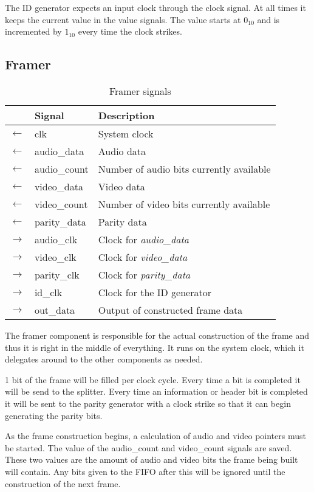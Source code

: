 The ID generator expects an input clock through the clock signal. At all times it keeps the current value in the value signals. The value starts at $0_{10}$ and is incremented by $1_{10}$ every time the clock strikes.

\subsection{Framer}
\begin{table}[!h]
\centering%
\caption{Framer signals}\label{tab:table}
\begin{tabular*}{\textwidth}{ll@{\hspace{1cm}}l}
  & \textbf{Signal} & \textbf{Description}\\\hline\hline
  $\leftarrow$ & clk & System clock\\\hline
  $\leftarrow$ & audio\_data & Audio data\\\hline
  $\leftarrow$ & audio\_count & Number of audio bits currently available\\\hline
  $\leftarrow$ & video\_data & Video data\\\hline
  $\leftarrow$ & video\_count & Number of video bits currently available\\\hline
  $\leftarrow$ & parity\_data & Parity data\\\hline
  $\rightarrow$ & audio\_clk & Clock for \textit{audio\_data}\\\hline
  $\rightarrow$ & video\_clk & Clock for \textit{video\_data}\\\hline
  $\rightarrow$ & parity\_clk & Clock for \textit{parity\_data}\\\hline
  $\rightarrow$ & id\_clk & Clock for the ID generator\\\hline
  $\rightarrow$ & out\_data & Output of constructed frame data\\
\end{tabular*}
\end{table}
The framer component is responsible for the actual construction of the frame and thus it is right in the middle of everything. It runs on the system clock, which it delegates around to the other components as needed.

1 bit of the frame will be filled per clock cycle. Every time a bit is completed it will be send to the splitter. Every time an information or header bit is completed it will be sent to the parity generator with a clock strike so that it can begin generating the parity bits.

As the frame construction begins, a calculation of audio and video pointers must be started. The value of the audio\_count and video\_count signals are saved. These two values are the amount of audio and video bits the frame being built will contain. Any bits given to the FIFO after this will be ignored until the construction of the next frame.

